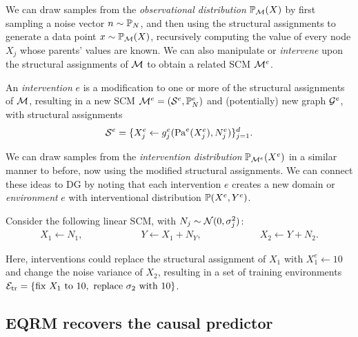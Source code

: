 \documentclass{article}
\begin{document}
We can draw samples from the \emph{observational distribution} $\mathbb{P}_{\mathcal{M}}(X)$ by first sampling a noise vector $n
%
\sim \bbP_{N}$, and then using the structural assignments to generate a data point $x
%
\sim \bbP_{\calM}(X)$, recursively computing the value of every node $X_j$ whose parents' values are known. We can also manipulate or \emph{intervene} upon the structural assignments of $\mathcal{M}$ to obtain a related SCM $\mathcal{M}^e$.

\begin{definition}\upshape
{} An \emph{intervention} $e$ is a modification to one or more of the structural assignments of $\mathcal{M}$, resulting in a new SCM $\mathcal{M}^e=(\mathcal{S}^e, \mathbb{P}^e_N)$ and (potentially) new graph $\mathcal{G}^e$, with structural assignments
\begin{equation}
\label{eq:interv-def}
    \mathcal{S}^e=\{ X^e_j \gets g^e_j(\mathrm{Pa}^e(X^e_j), N^e_j)\}_{j = 1}^d.
\end{equation}%
\end{definition}%
We can draw samples from the \textit{intervention distribution} $\mathbb{P}_{\mathcal{M}^e}(X^e)$ in a similar manner to before, now using the modified structural assignments. We can connect these ideas to DG by noting that each intervention $e$ creates a new domain or \emph{environment} $e$ with interventional distribution $\mathbb{P}(X^e, Y^e)$.

%

\begin{example}\label{ex:example}
Consider the following linear
%
SCM, with $N_j \sim \mathcal{N}(0, \sigma^2_j)$:
\begin{align*}
\textstyle
    X_1     \gets              N_1, \qquad\qquad\qquad
    Y       \gets X_1        + N_Y, \qquad\qquad\qquad
    X_2     \gets Y        + N_2.
\end{align*}%
%
%
%
%
%
\end{example}%
Here, interventions could
%
replace the structural assignment of $X_1$ with $X^e_1 \gets 10$ and
%
change the noise variance of $X_2$, resulting in a set of training environments $\mathcal{E}_\text{tr} = \{\text{fix}\ X_1\ \text{to}\ 10,\ \text{replace}\ \sigma_2\ \text{with}\ 10\}$.
%
%
%

\subsection{EQRM recovers the causal predictor}
\label{app:causality:discovery}
\end{document}
